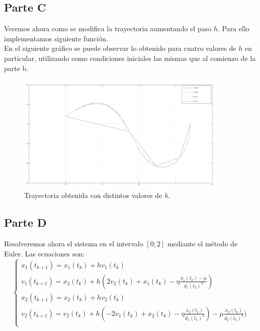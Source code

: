 \documentclass[titlepage,a4paper]{article}
\begin{document}
	\subsection{Parte C}\label{sec:parteC}
	Veremos ahora como se modifica la trayectoria aumentando el paso $h$. Para ello implementamos siguiente función.\\

	

	En el siguiente gráfico se puede observar lo obtenido para cuatro valores  de $h$ en particular, utilizando como condiciones iniciales las mismas que al comienzo de la parte b.\\
	\begin{figure}[H]
		\centering
		\includegraphics[width=0.9\textwidth]{partec.png}
		\caption{\label{fig:partec}Trayectoria obtenida con distintos valores de \emph{h}.}
	\end{figure}

	\subsection{Parte D}\label{sec:parteD}
	Resolveremos ahora el sistema en el intervalo $[0; 2]$ mediante el método de Euler. Las ecuaciones son:
	\begin{equation}
		\label{inicial}
		\begin{cases}
			x_1 (t_{k+1}) = x_1 (t_{k}) + hv_1 (t_{k})\\
			v_1 (t_{k+1}) = x_2 (t_{k}) + h(2v_2 (t_{k}) + x_1 (t_{k}) - \eta\frac{x_1 (t_{k}) - \mu}{d_1 (t_{k})^{3}})\\
			x_2 (t_{k+1}) = x_2 (t_{k}) + hv_2 (t_{k})\\
			v_2 (t_{k+1}) = v_2 (t_{k}) + h(-2v_1 (t_{k}) + x_2 (t_{k}) - \eta\frac{x_2 (t_{k})}{d_1 (t_{k})^{3}}) - \mu\frac{x_2 (t_{k})}{d_2 (t_{k})^{3}})\\
		\end{cases}
	\end{equation}
\end{document}
